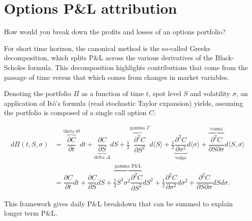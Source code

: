 \section{Options P\&L attribution}

\begin{tcolorbox}[width=\linewidth, sharp corners=all, colback=white!95!black]
    How would you break down the profits and losses of an options portfolio?
\end{tcolorbox}

For short time horizon, the canonical method is the so-called Greeks decomposition, which splits P\&L across the various derivatives of the Black-Scholes formula. This decomposition highlights contributions that come from the passage of time versus that which comes from changes in market variables.

Denoting the portfolio $\Pi$ as a function of time $t$, spot level $S$ and volatility $\sigma$, an application of It\^o's formula (read stochastic Taylor expansion) yields, assuming the portfolio is composed of a single call option $C$:

\begin{align*}
    d\Pi(t, S, \sigma) &= \overbrace{\dfrac{\partial C}{\partial t}}^{\text{theta } \Theta}dt + \underbrace{\dfrac{\partial C}{\partial S}}_{\text{delta } \Delta}dS +  \frac1{2}\overbrace{\dfrac{\partial^2 C}{\partial S^2}}^{\text{gamma } \Gamma}d\langle S \rangle + \frac1{2}\underbrace{\dfrac{\partial^2 C}{\partial \sigma^2}}_{\text{volga}} d\langle \sigma \rangle + \overbrace{\dfrac{\partial^2 C}{ \partial S \partial \sigma}}^{\text{vanna}} d\langle S, \sigma \rangle\\
    &= \dfrac{\partial C}{\partial t}dt + \dfrac{\partial C}{\partial S}dS +  \overbrace{\frac1{2} S^2 \sigma^2 \dfrac{\partial^2 C}{\partial S^2}}^{\text{gamma P\&L}} dS^2 + \frac1{2}\dfrac{\partial^2 C}{\partial \sigma^2} d\sigma^2 + \dfrac{\partial^2 C}{ \partial S \partial \sigma} dS d\sigma.
\end{align*}

This framework gives daily P\&L breakdown that can be summed to explain longer term P\&L.